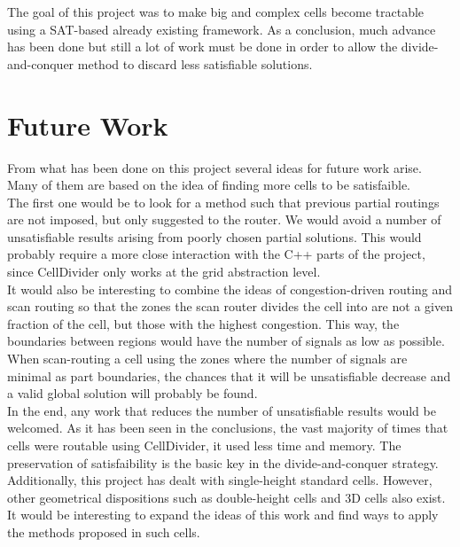 The goal of this project was to make big and complex cells become tractable using a SAT-based already existing framework. As a conclusion, much advance has been done but still a lot of work must be done in order to allow the divide-and-conquer method to discard less satisfiable solutions.

\section{Future Work}

From what has been done on this project several ideas for future work arise. Many of them are based on the idea of finding more cells to be satisfaible. \\

The first one would be to look for a method such that previous partial routings are not imposed, but only suggested to the router. We would avoid a number of unsatisfiable results arising from poorly chosen partial solutions. This would probably require a more close interaction with the C++ parts of the project, since CellDivider only works at the grid abstraction level. \\

It would also be interesting to combine the ideas of congestion-driven routing and scan routing so that the zones the scan router divides the cell into are not a given fraction of the cell, but those with the highest congestion. This way, the boundaries between regions would have the number of signals as low as possible. When scan-routing a cell using the zones where the number of signals are minimal as part boundaries, the chances that it will be unsatisfiable decrease and a valid global solution will probably be found. \\

In the end, any work that reduces the number of unsatisfiable results would be welcomed. As it has been seen in the conclusions, the vast majority of times that cells were routable using CellDivider, it used less time and memory. The preservation of satisfaibility is the basic key in the divide-and-conquer strategy.\\

Additionally, this project has dealt with single-height standard cells. However, other geometrical dispositions such as double-height cells and 3D cells also exist. It would be interesting to expand the ideas of this work and find ways to apply the methods proposed in such cells. \\


